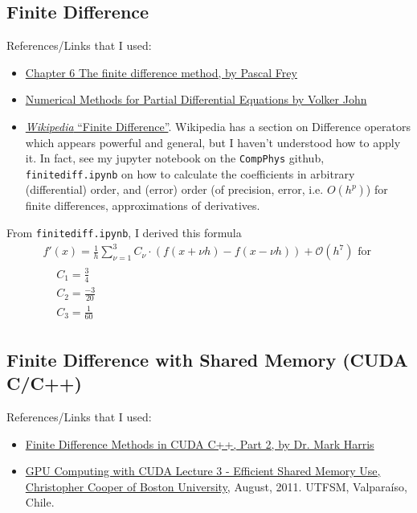 \documentclass[10pt]{amsart}
\begin{document}
\begin{multicols*}{2}
\section{Finite Difference}

References/Links that I used:
\begin{itemize}
\item \href{http://www.ann.jussieu.fr/~frey/cours/UdC/ma691/ma691_ch6.pdf}{Chapter 6 The finite difference method, by Pascal Frey}
\item \href{https://www.wias-berlin.de/people/john/LEHRE/NUM_PDE_FUB/num_pde_fub.pdf}{Numerical Methods for Partial Differential Equations by Volker John}
\item \href{https://en.wikipedia.org/wiki/Finite_difference}{\emph{Wikipedia} ``Finite Difference''}.  Wikipedia has a section on Difference operators which appears powerful and general, but I haven't understood how to apply it.  In fact, see my jupyter notebook on the \verb|CompPhys| github, \verb|finitediff.ipynb| on how to calculate the coefficients in arbitrary (differential) order, and (error) order (of precision, error, i.e. $O(h^p)$) for finite differences, approximations of derivatives.  
\end{itemize}

From \verb|finitediff.ipynb|, I derived this formula
\begin{equation}
  \begin{gathered}
    f'(x) = \frac{1}{h} \sum_{\nu =1}^3 C_{\nu} \cdot (f(x+\nu h)-f(x-\nu h)) + \mathcal{O}(h^7) \text{ for } \\
    \begin{aligned}
      & C_1 = \frac{3}{4} \\ 
      & C_2 = \frac{-3}{20 } \\ 
      & C_3 = \frac{1}{60}
      \end{aligned}
  \end{gathered}
  \end{equation}

\subsection{Finite Difference with Shared Memory (CUDA C/C++)}

References/Links that I used:
\begin{itemize}
\item \href{https://devblogs.nvidia.com/parallelforall/finite-difference-methods-cuda-c-part-2/}{Finite Difference Methods in CUDA C++, Part 2, by Dr. Mark Harris}
\item \href{http://www.bu.edu/pasi/files/2011/07/Lecture31.pdf}{GPU Computing with CUDA
Lecture 3 - Efficient Shared Memory Use, Christopher Cooper of Boston University}, August, 2011.  UTFSM, Valpara\'{i}so, Chile.   
  \end{itemize}


\end{multicols*}
\end{document}
